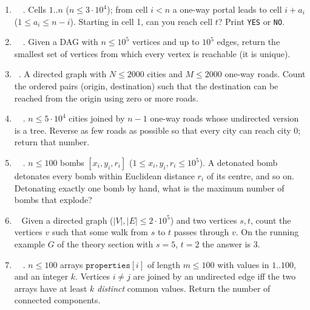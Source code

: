 \exlegend
\begin{enumerate}[leftmargin=*, label=\textbf{E2.\arabic*}, itemsep=6pt]
    \item \exeasy\ \pconcept {}\ . Cells $1..n$ ($n \le 3\cdot10^4$); from cell $i < n$ a one-way portal leads to cell $i + a_i$ ($1 \le a_i \le n-i$). Starting in cell 1, can you reach cell $t$? Print \texttt{YES} or \texttt{NO}.
    \item \exeasy\ \ptricky {}\ . Given a DAG with $n \le 10^5$ vertices and up to $10^5$ edges, return the smallest set of vertices from which every vertex is reachable (it is unique).
    \item \exmedium\ \pconcept {}. A directed graph with $N \le 2000$ cities and $M \le 2000$ one-way roads. Count the ordered pairs (origin, destination) such that the destination can be reached from the origin using zero or more roads.
    \item \exmedium\ \pclassic {}\ . $n \le 5\cdot10^4$ cities joined by $n-1$ one-way roads whose undirected version is a tree. Reverse as few roads as possible so that every city can reach city 0; return that number.
    \item \exmedium\ \ptricky {}\ . $n \le 100$ bombs $[x_i, y_i, r_i]$ ($1 \le x_i, y_i, r_i \le 10^5$). A detonated bomb detonates every bomb within Euclidean distance $r_i$ of its centre, and so on. Detonating exactly one bomb by hand, what is the maximum number of bombs that explode?
    \item \exmedium\ \pconcept {} Given a directed graph ($|V|, |E| \le 2\cdot 10^5$) and two vertices $s, t$, count the vertices $v$ such that some walk from $s$ to $t$ passes through $v$. On the running example $G$ of the theory section with $s = 5$, $t = 2$ the answer is $3$.
    \item \exmedium\ \precent {}\ . $n \le 100$ arrays $\texttt{properties}[i]$ of length $m \le 100$ with values in $1..100$, and an integer $k$. Vertices $i \ne j$ are joined by an undirected edge iff the two arrays have at least $k$ \emph{distinct} common values. Return the number of connected components.
\end{enumerate}


